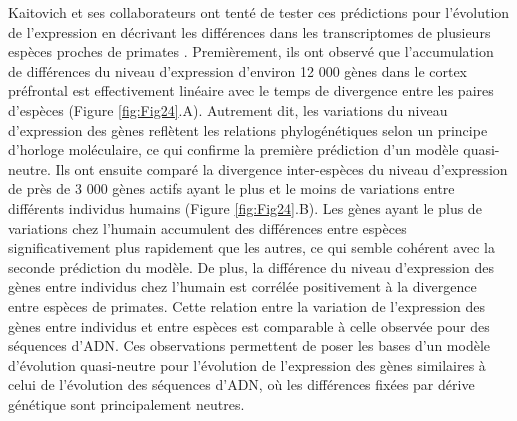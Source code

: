 Kaitovich et ses collaborateurs ont tenté de tester ces prédictions pour l’évolution de l’expression en décrivant les différences dans les transcriptomes de plusieurs espèces proches de primates \citep{khaitovich_neutral_2004}. Premièrement, ils ont observé que l’accumulation de différences du niveau d’expression d’environ 12 000 gènes dans le cortex préfrontal est effectivement linéaire avec le temps de divergence entre les paires d’espèces (Figure \ref{fig:Fig24}.A). Autrement dit, les variations du niveau d’expression des gènes reflètent les relations phylogénétiques selon un principe d’horloge moléculaire, ce qui confirme la première prédiction d’un modèle quasi-neutre. Ils ont ensuite comparé la divergence inter-espèces du niveau d’expression de près de 3 000 gènes actifs ayant le plus et le moins de variations entre différents individus humains (Figure \ref{fig:Fig24}.B). Les gènes ayant le plus de variations chez l’humain accumulent des différences entre espèces significativement plus rapidement que les autres, ce qui semble cohérent avec la seconde prédiction du modèle. De plus, la différence du niveau d’expression des gènes entre individus chez l’humain est corrélée positivement à la divergence entre espèces de primates. Cette relation entre la variation de l’expression des gènes entre individus et entre espèces est comparable à celle observée pour des séquences d’ADN. Ces observations permettent de poser les bases d’un modèle d’évolution quasi-neutre pour l’évolution de l’expression des gènes similaires à celui de l’évolution des séquences d’ADN, où les différences fixées par dérive génétique sont principalement neutres.

